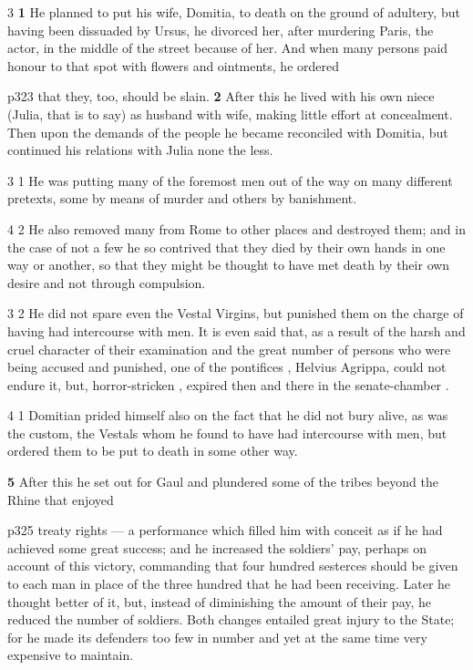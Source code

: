 3 \textbf{1} He planned to put his wife, Domitia, to death on the ground of adultery, but having been dissuaded by Ursus, he divorced her, after murdering Paris, the actor, in the middle of the street because of her. And when many persons paid honour to that spot with flowers and ointments, he ordered

p323 that they, too, should be slain. \textbf{2} After this he lived with his own niece (Julia, that is to say) as husband with wife, making little effort at concealment. Then upon the demands of the people he became reconciled with Domitia, but continued his relations with Julia none the less.

3 1 He was putting many of the foremost men out of the way on many different pretexts, some by means of murder and others by banishment.

4 2 He also removed many from Rome to other places and destroyed them; and in the case of not a few he so contrived that they died by their own hands in one way or another, so that they might be thought to have met death by their own desire and not through compulsion.

3 2 He did not spare even the Vestal Virgins, but punished them on the charge of having had intercourse with men. It is even said that, as a result of the harsh and cruel character of their examination and the great number of persons who were being accused and punished, one of the pontifices , Helvius Agrippa, could not endure it, but, horror-stricken , expired then and there in the senate-chamber .

4 1
Domitian prided himself also on the fact that he did not bury alive, as was the custom, the Vestals whom he found to have had intercourse with men, but ordered them to be put to death in some other way.

\textbf{5} After this he set out for Gaul and plundered some of the tribes beyond the Rhine that enjoyed

p325 treaty rights \texthebrew{—} a performance which filled him with conceit as if he had achieved some great success; and he increased the soldiers' pay, perhaps on account of this victory, commanding that four hundred sesterces should be given to each man in place of the three hundred that he had been receiving. Later he thought better of it, but, instead of diminishing the amount of their pay, he reduced the number of soldiers. Both changes entailed great injury to the State; for he made its defenders too few in number and yet at the same time very expensive to maintain.

